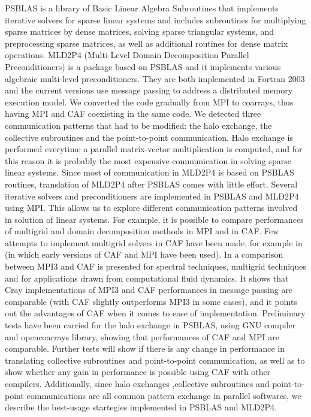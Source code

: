 \documentclass{IOS-Book-Article}
\begin{document}
PSBLAS is a library of Basic Linear Algebra Subroutines that implements iterative solvers for sparse linear systems and includes subroutines for multiplying sparse matrices by dense matrices, solving sparse triangular systems, and preprocessing sparse matrices, as well as additional routines for dense matrix operations. MLD2P4 (Multi-Level Domain Decomposition Parallel Preconditioners) is a package based on PSBLAS and it implements various algebraic multi-level preconditioners. They are both implemented in Fortran 2003 and the current versions use message passing to address a distributed memory execution model. We converted the code gradually from MPI to coarrays, thus having MPI and CAF coexisting in the same code. We detected three communication patterns that had to be modified: the halo exchange, the collective subroutines and the point-to-point communication. Halo exchange is performed everytime a parallel matrix-vector multiplication is computed, and for this reason it is probably the most expensive communication in solving sparse linear systems. Since most of communication in MLD2P4 is based on PSBLAS routines, translation of MLD2P4 after PSBLAS comes with little effort.
Several iterative solvers and preconditioners are implemented in PSBLAS and MLD2P4 using MPI. This allows us to explore different communication patterns involved in solution of linear systems. For example, it is possible to compare performances of multigrid and domain decomposition methods in MPI and in CAF. Few attempts to implement multigrid solvers in CAF have been made, for example in \cite{r4} (in which early versions of CAF and MPI have been used).  In \cite{r5} a comparison between MPI3 and CAF is presented for spectral techniques, multigrid techniques and for applications drawn from computational fluid dynamics. It shows that Cray implementations of MPI3 and CAF performances in message passing are comparable (with CAF slightly outperforms MPI3 in some cases), and it points out the advantages of CAF when it comes to ease of implementation. 
Preliminary tests have been carried for the halo exchange in PSBLAS, using GNU compiler and opencoarrays library, showing that performances of CAF and MPI are comparable. Further tests will show if there is any change in performance in translating collective subroutines and point-to-point communication, as well as to show whether any gain in performance is possible using CAF with other compilers. 
Additionally, since halo exchanges ,collective subroutines and point-to-point communications are all common pattern exchange in parallel softwares, we describe the best-usage startegies implemented in PSBLAS and MLD2P4.
\end{document}
